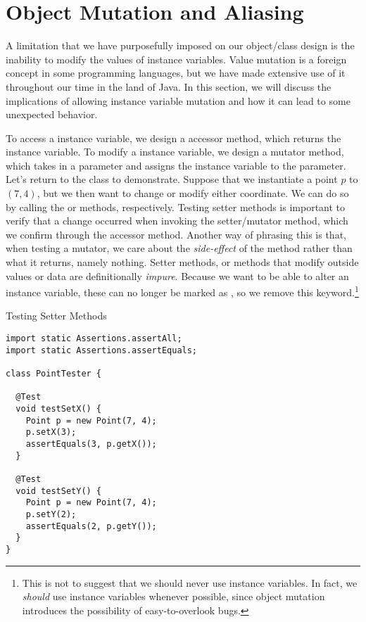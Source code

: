 \section{Object Mutation and Aliasing}
\label{sec:object-mutation-and-aliasing}
A limitation that we have purposefully imposed on our object/class design is the inability to modify the values of instance variables. Value mutation is a foreign concept in some programming languages, but we have made extensive use of it throughout our time in the land of Java. In this section, we will discuss the implications of allowing instance variable mutation and how it can lead to some unexpected behavior.

To access a  instance variable, we design a  accessor method, which returns the instance variable. To modify a  instance variable, we design a  mutator method, which takes in a parameter and assigns the instance variable to the parameter. Let's return to the  class to demonstrate. Suppose that we instantiate a point $p$ to $(7, 4)$, but we then want to change or modify either coordinate. We can do so by calling the  or  methods, respectively. Testing setter methods is important to verify that a change occurred when invoking the setter/mutator method, which we confirm through the accessor method. Another way of phrasing this is that, when testing a mutator, we care about the \textit{side-effect} of the method rather than what it returns, namely nothing. Setter methods, or methods that modify outside values or data are definitionally \textit{impure}. Because we want to be able to alter an instance variable, these can no longer be marked as , so we remove this keyword.\footnote{This is not to suggest that we should never use  instance variables. In fact, we \textit{should} use  instance variables whenever possible, since object mutation introduces the possibility of easy-to-overlook bugs.}

\begin{cl}[]{Testing  Setter Methods}
\begin{lstlisting}[language=MyJava]
import static Assertions.assertAll;
import static Assertions.assertEquals;

class PointTester {

  @Test
  void testSetX() {
    Point p = new Point(7, 4);
    p.setX(3);
    assertEquals(3, p.getX());
  }

  @Test
  void testSetY() {
    Point p = new Point(7, 4);
    p.setY(2);
    assertEquals(2, p.getY());
  }
}
\end{lstlisting}
\end{cl}

